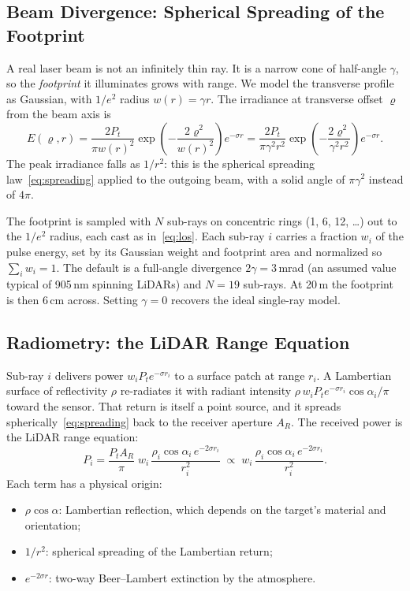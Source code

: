 \documentclass[11pt]{article}
\begin{document}
\subsection{Beam Divergence: Spherical Spreading of the Footprint}\label{sec:beam}
A real laser beam is not an infinitely thin ray. It is a narrow cone of half-angle $\gamma$, so the \emph{footprint} it illuminates grows with range.
We model the transverse profile as Gaussian, with $1/e^2$ radius $w(r) = \gamma r$. The irradiance at transverse offset $\varrho$ from the beam axis is
\begin{equation}\label{eq:gauss}
    E(\varrho, r) = \frac{2 P_t}{\pi w(r)^2} \exp\!\left(-\frac{2\varrho^2}{w(r)^2}\right) e^{-\sigma r}
                 = \frac{2 P_t}{\pi \gamma^2 r^2} \exp\!\left(-\frac{2\varrho^2}{\gamma^2 r^2}\right) e^{-\sigma r}.
\end{equation}
The peak irradiance falls as $1/r^2$: this is the spherical spreading law~\eqref{eq:spreading} applied to the outgoing beam, with a solid angle of $\pi\gamma^2$ instead of $4\pi$.

The footprint is sampled with $N$ sub-rays on concentric rings (1, 6, 12, \dots) out to the $1/e^2$ radius, each cast as in~\eqref{eq:los}.
Each sub-ray $i$ carries a fraction $w_i$ of the pulse energy, set by its Gaussian weight and footprint area and normalized so $\sum_i w_i = 1$.
The default is a full-angle divergence $2\gamma = 3$\,mrad (an assumed value typical of 905\,nm spinning LiDARs) and $N = 19$ sub-rays.
At 20\,m the footprint is then 6\,cm across. Setting $\gamma = 0$ recovers the ideal single-ray model.

\subsection{Radiometry: the LiDAR Range Equation}\label{sec:radiometry}
Sub-ray $i$ delivers power $w_i P_t e^{-\sigma r_i}$ to a surface patch at range $r_i$. A Lambertian surface of reflectivity $\rho$ re-radiates it
with radiant intensity $\rho\, w_i P_t e^{-\sigma r_i} \cos\alpha_i / \pi$ toward the sensor. That return is itself a point source,
and it spreads spherically~\eqref{eq:spreading} back to the receiver aperture $A_R$. The received power is the LiDAR range equation:
\begin{equation}\label{eq:range}
    P_i = \frac{P_t A_R}{\pi}\; w_i\, \frac{\rho_i \cos\alpha_i \, e^{-2\sigma r_i}}{r_i^2}
        \;\propto\; w_i\, \frac{\rho_i \cos\alpha_i \, e^{-2\sigma r_i}}{r_i^2}.
\end{equation}
Each term has a physical origin:
\begin{itemize}
    \item $\rho\cos\alpha$: Lambertian reflection, which depends on the target's material and orientation;
    \item $1/r^2$: spherical spreading of the Lambertian return;
    \item $e^{-2\sigma r}$: two-way Beer--Lambert extinction by the atmosphere.
\end{itemize}
\end{document}
